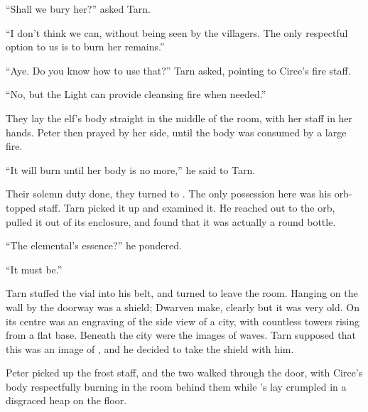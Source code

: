 ``Shall we bury her?'' asked Tarn.

``I don't think we can, without being seen by the villagers.  The only respectful option to us is to burn her remains.''

``Aye.  Do you know how to use that?'' Tarn asked, pointing to Circe's fire staff.

``No, but the Light can provide cleansing fire when needed.''

They lay the elf's body straight in the middle of the room, with her staff in her hands.  Peter then prayed by her side, until the body was consumed by a large fire.

``It will burn until her body is no more,'' he said to Tarn.


Their solemn duty done, they turned to \mothzam \driktur.  The only possession here was his orb-topped staff.  Tarn picked it up and examined it.  He reached out to the orb, pulled it out of its enclosure, and found that it was actually a round bottle.

``The elemental's essence?'' he pondered.

``It must be.''

Tarn stuffed the vial into his belt, and turned to leave the room.  Hanging on the wall by the doorway was a shield; Dwarven make, clearly but it was very old.  On its centre was an engraving of the side view of a city, with countless towers rising from a flat base.  Beneath the city were the images of waves.  Tarn supposed that this was an image of \valdunmir, and he decided to take the shield with him.

Peter picked up the frost staff, and the two walked through the door, with Circe's body respectfully burning in the room behind them while \mothzam's lay crumpled in a disgraced heap on the floor.